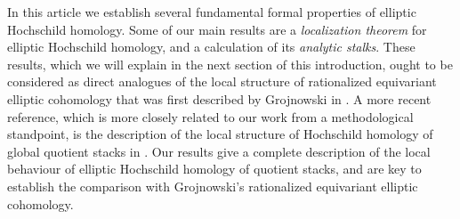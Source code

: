 \documentclass[11pt,letterpaper]{amsart}
\begin{document}
In this article we  establish several  fundamental formal properties of elliptic Hochschild homology.  
Some of our main results   are a \emph{localization theorem} for elliptic Hochschild homology, and a calculation of its \emph{analytic stalks}. These results, which we will explain in the next section of this introduction, ought to be considered as direct analogues of the local structure of rationalized equivariant elliptic cohomology that was first described by Grojnowski in \cite{groj}. A more recent reference, which is more closely related to our work from a methodological standpoint, is the description of the local structure of Hochschild homology of global quotient stacks in \cite{HChen}. 
Our results give a complete description of the local behaviour of elliptic Hochschild homology of quotient stacks, and  are key  to establish the comparison with Grojnowski's rationalized equivariant elliptic cohomology. 
\end{document}
